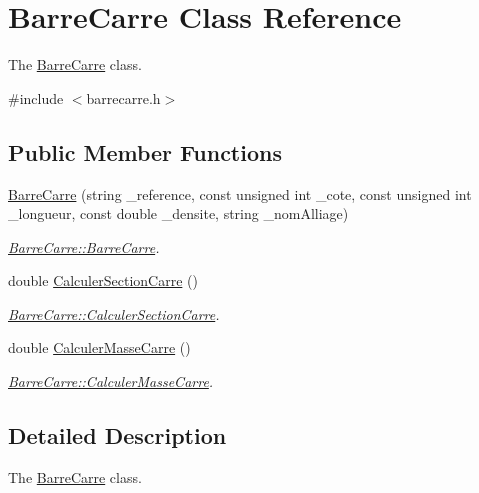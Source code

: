 \hypertarget{class_barre_carre}{}\section{Barre\+Carre Class Reference}
\label{class_barre_carre}


The \hyperlink{class_barre_carre}{Barre\+Carre} class.  




{\ttfamily \#include $<$barrecarre.\+h$>$}

\subsection*{Public Member Functions}
\begin{DoxyCompactItemize}
\item 
\hyperlink{class_barre_carre_a70a877ae2e89e70535effb94d6123c42}{Barre\+Carre} (string \+\_\+reference, const unsigned int \+\_\+cote, const unsigned int \+\_\+longueur, const double \+\_\+densite, string \+\_\+nom\+Alliage)
\begin{DoxyCompactList}\small\item\em \hyperlink{class_barre_carre_a70a877ae2e89e70535effb94d6123c42}{Barre\+Carre\+::\+Barre\+Carre}. \end{DoxyCompactList}\item 
double \hyperlink{class_barre_carre_afd84f26aa744458aa216859c6a2c20b7}{Calculer\+Section\+Carre} ()
\begin{DoxyCompactList}\small\item\em \hyperlink{class_barre_carre_afd84f26aa744458aa216859c6a2c20b7}{Barre\+Carre\+::\+Calculer\+Section\+Carre}. \end{DoxyCompactList}\item 
double \hyperlink{class_barre_carre_a5a6899c1d2e1c81e80ef6dd08e4fc756}{Calculer\+Masse\+Carre} ()
\begin{DoxyCompactList}\small\item\em \hyperlink{class_barre_carre_a5a6899c1d2e1c81e80ef6dd08e4fc756}{Barre\+Carre\+::\+Calculer\+Masse\+Carre}. \end{DoxyCompactList}\end{DoxyCompactItemize}


\subsection{Detailed Description}
The \hyperlink{class_barre_carre}{Barre\+Carre} class. 

